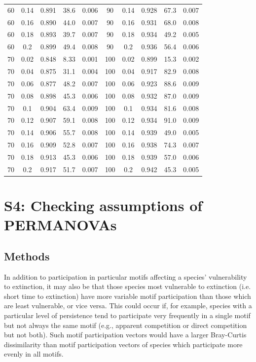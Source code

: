 \documentclass[12pt]{article}
\begin{document}
\begin{spacing}{2.0}
\begin{table}[hb!]
\begin{tabular}{c c | c | c c ||c c | c | c c |}
                60&0.14&0.891&38.6&0.006	&	90&0.14&0.928&67.3&0.007\\
                60&0.16&0.890&44.0&0.007	&	90&0.16&0.931&68.0&0.008\\
                60&0.18&0.893&39.7&0.007	&	90&0.18&0.934&49.2&0.005\\
                60&0.2&0.899&49.4&0.008	&	90&0.2&0.936&56.4&0.006\\
                70&0.02&0.848&8.33&0.001	&	100&0.02&0.899&15.3&0.002\\
                70&0.04&0.875&31.1&0.004	&	100&0.04&0.917&82.9&0.008\\
                70&0.06&0.877&48.2&0.007	&	100&0.06&0.923&88.6&0.009\\
                70&0.08&0.898&45.3&0.006	&	100&0.08&0.932&87.0&0.009\\
                70&0.1&0.904&63.4&0.009	&	100&0.1&0.934&81.6&0.008\\
                70&0.12&0.907&59.1&0.008	&	100&0.12&0.934&91.0&0.009\\
                70&0.14&0.906&55.7&0.008	&	100&0.14&0.939&49.0&0.005\\
                70&0.16&0.909&52.8&0.007	&	100&0.16&0.938&74.3&0.007\\
                70&0.18&0.913&45.3&0.006	&	100&0.18&0.939&57.0&0.006\\
                70&0.2&0.917&51.7&0.007	&	100&0.2&0.942&45.3&0.005\\
				\hline
			\end{tabular}
			\end{table}

\clearpage


\section*{S4: Checking assumptions of PERMANOVAs}

	\subsection*{Methods}

        
        In addition to participation in particular motifs affecting a species' vulnerability to extinction, it may also be that those species most vulnerable to extinction (i.e. short time to extinction) have more variable motif participation than those which are least vulnerable, or vice versa. 
        This could occur if, for example, species with a particular level of persistence tend to participate very frequently in a single motif but not always the same motif (e.g., apparent competition or direct competition but not both). 
        Such motif participation vectors would have a larger Bray-Curtis dissimilarity than motif participation vectors of species which participate more evenly in all motifs.



\end{spacing}
\end{document}
